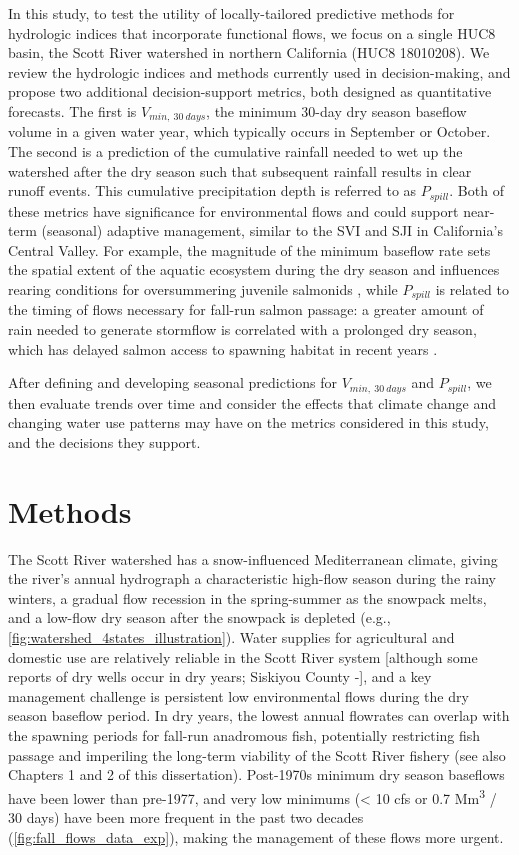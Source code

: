 \documentclass[hess, manuscript]{copernicus}
\begin{document}
In this study, to test the utility of locally-tailored predictive
methods for hydrologic indices that incorporate functional flows, we
focus on a single HUC8 basin, the Scott River watershed in northern
California (HUC8 18010208). We review the hydrologic indices and methods
currently used in decision-making, and propose two additional
decision-support metrics, both designed as quantitative forecasts. The
first is \(V_{min,~30~days}\), the minimum 30-day dry season baseflow
volume in a given water year, which typically occurs in September or
October. The second is a prediction of the cumulative rainfall needed to
wet up the watershed after the dry season such that subsequent rainfall
results in clear runoff events. This cumulative precipitation depth is
referred to as \(P_{spill}\). Both of these metrics have significance
for environmental flows and could support near-term (seasonal) adaptive
management, similar to the SVI and SJI in California's Central Valley.
For example, the magnitude of the minimum baseflow rate sets the spatial
extent of the aquatic ecosystem during the dry season and influences
rearing conditions for oversummering juvenile salmonids
\citep{Gorman2016}, while \(P_{spill}\) is related to the timing of
flows necessary for fall-run salmon passage: a greater amount of rain
needed to generate stormflow is correlated with a prolonged dry season,
which has delayed salmon access to spawning habitat in recent years
\citeyearpar[CDFW][]{CDFW2015a}.

After defining and developing seasonal predictions for
\(V_{min,~30~days}\) and \(P_{spill}\), we then evaluate trends over
time and consider the effects that climate change and changing water use
patterns may have on the metrics considered in this study, and the
decisions they support.

\section{Methods}

The Scott River watershed has a snow-influenced Mediterranean climate,
giving the river's annual hydrograph a characteristic high-flow season
during the rainy winters, a gradual flow recession in the spring-summer
as the snowpack melts, and a low-flow dry season after the snowpack is
depleted (e.g., \autoref{fig:watershed_4states_illustration}). Water
supplies for agricultural and domestic use are relatively reliable in
the Scott River system {[}although some reports of dry wells occur in
dry years; Siskiyou County -\citet{SiskiyouCounty2021}{]}, and a key
management challenge is persistent low environmental flows during the
dry season baseflow period. In dry years, the lowest annual flowrates
can overlap with the spawning periods for fall-run anadromous fish,
potentially restricting fish passage and imperiling the long-term
viability of the Scott River fishery \citeyearpar[Siskiyou
County][]{SiskiyouCounty2021} (see also Chapters 1 and 2 of this
dissertation). Post-1970s minimum dry season baseflows have been lower
than pre-1977, and very low minimums (\textless{} 10 cfs or 0.7
Mm\textsuperscript{3} / 30 days) have been more frequent in the past two
decades (\autoref{fig:fall_flows_data_exp}), making the management of
these flows more urgent.
\end{document}
